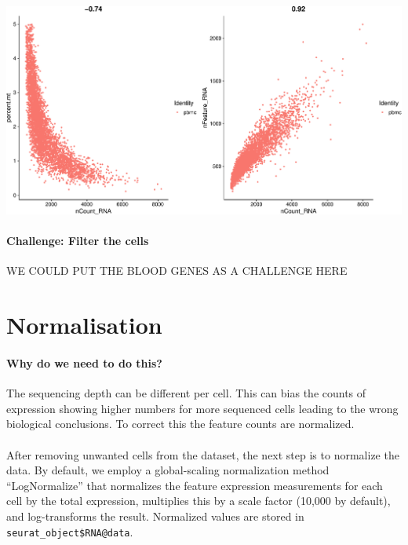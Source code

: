 \documentclass[
]{book}
\begin{document}
\includegraphics{scRNAseqInR_ABACBS_2024_Doco_files/figure-latex/qc2_sidebar-1.pdf}

\hypertarget{challenge-filter-the-cells}{%
\subsubsection*{Challenge: Filter the cells}\label{challenge-filter-the-cells}}

WE COULD PUT THE BLOOD GENES AS A CHALLENGE HERE

\hypertarget{norm}{%
\chapter{Normalisation}\label{norm}}

\hypertarget{why-do-we-need-to-do-this-1}{%
\subsubsection*{Why do we need to do this?}\label{why-do-we-need-to-do-this-1}}

The sequencing depth can be different per cell. This can bias the counts of expression showing higher numbers for more sequenced cells leading to the wrong biological conclusions. To correct this the feature counts are normalized.

\hypertarget{section-3}{%
\subsubsection*{}\label{section-3}}

After removing unwanted cells from the dataset, the next step is to normalize the data. By default, we employ a global-scaling normalization method ``LogNormalize'' that normalizes the feature expression measurements for each cell by the total expression, multiplies this by a scale factor (10,000 by default), and log-transforms the result. Normalized values are stored in \texttt{seurat\_object\$RNA@data}.
\end{document}

